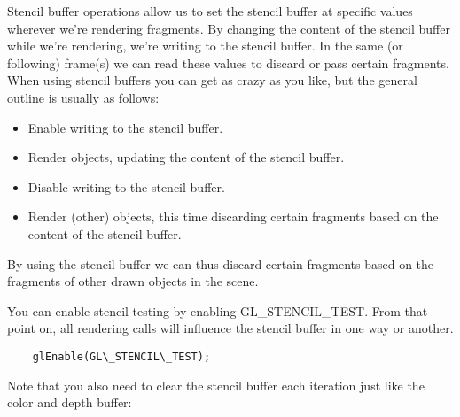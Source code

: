 \documentclass{article}
\begin{document}
Stencil buffer operations allow us to set the stencil buffer at specific values wherever we're rendering fragments. By changing the content of the stencil buffer while we're rendering, we're writing to the stencil buffer. In the same (or following) frame(s) we can read these values to discard or pass certain fragments. When using stencil buffers you can get as crazy as you like, but the general outline is usually as follows:
\begin{itemize}
\item Enable writing to the stencil buffer.
\item Render objects, updating the content of the stencil buffer.
\item Disable writing to the stencil buffer.
\item Render (other) objects, this time discarding certain fragments based on the content of the stencil buffer.
\end{itemize}

By using the stencil buffer we can thus discard certain fragments based on the fragments of other drawn objects in the scene.

You can enable stencil testing by enabling GL\_STENCIL\_TEST. From that point on, all rendering calls will influence the stencil buffer in one way or another.

\begin{lstlisting}
    glEnable(GL\_STENCIL\_TEST);
\end{lstlisting}

Note that you also need to clear the stencil buffer each iteration just like the color and depth buffer:
\end{document}
